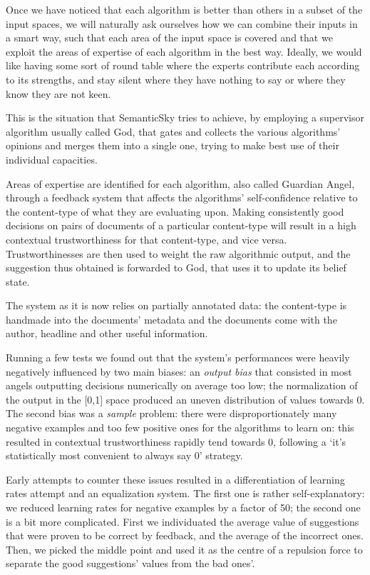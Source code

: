 \documentclass[11pt]{article}
\begin{document}
Once we have noticed that each algorithm is better than others in a subset of the input spaces, we will naturally ask ourselves how we can combine their inputs in a smart way, such that each area of the input space is covered and that we exploit the areas of expertise of each algorithm in the best way. Ideally, we would like having some sort of round table where the experts contribute each according to its strengths, and stay silent where they have nothing to say or where they know they are not keen.

This is the situation that SemanticSky tries to achieve, by employing a supervisor algorithm usually called God, that gates and collects the various algorithms' opinions and merges them into a single one, trying to make best use of their individual capacities.

Areas of expertise are identified for each algorithm, also called Guardian Angel, through a feedback system that affects the algorithms' self-confidence relative to the content-type of what they are evaluating upon. Making consistently good decisions on pairs of documents of a particular content-type will result in a high contextual trustworthiness for that content-type, and vice versa.
Trustworthinesses are then used to weight the raw algorithmic output, and the suggestion thus obtained is forwarded to God, that uses it to update its belief state.

The system as it is now relies on partially annotated data: the content-type is handmade into the documents' metadata and the documents come with the author, headline and other useful information.

Running a few tests we found out that the system's performances were heavily negatively influenced by two main biases: an \emph{output bias} that consisted in most angels outputting decisions numerically on average too low; the normalization of the output in the [0,1] space produced an uneven distribution of values towards 0. 
The second bias was a \emph{sample} problem: there were disproportionately many negative examples and too few positive ones for the algorithms to learn on: this resulted in contextual trustworthiness rapidly tend towards 0, following a `it's statistically most convenient to always say 0' strategy.

Early attempts to counter these issues resulted in a differentiation of learning rates attempt and an equalization system. The first one is rather self-explanatory: we reduced learning rates for negative examples by a factor of 50; the second one is a bit more complicated. First we individuated the average value of suggestions that were proven to be correct by feedback, and the average of the incorrect ones. Then, we picked the middle point and used it as the centre of a repulsion force to separate the good suggestions' values from the bad ones'.
\end{document}
